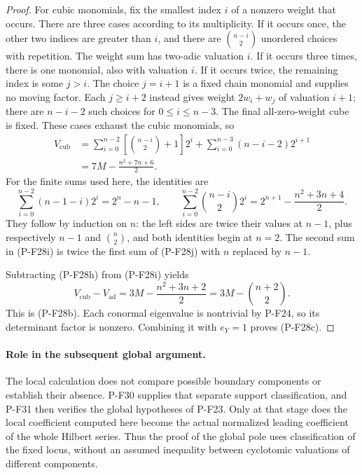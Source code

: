 \begin{proof}
For cubic monomials, fix the smallest index $i$
of a nonzero weight that occurs. There are three
cases according to its multiplicity. If it occurs
once, the other two indices are greater than $i$,
and there are $\binom{n-i}{2}$ unordered choices
with repetition. The weight sum has two-adic
valuation $i$. If it occurs three times, there is
one monomial, also with valuation $i$.
If it occurs twice, the remaining index is some
$j>i$. The choice $j=i+1$ is a fixed chain
monomial and supplies no moving factor. Each
$j\ge i+2$ instead gives weight $2w_i+w_j$ of
valuation $i+1$; there are $n-i-2$ such choices
for $0\le i\le n-3$. The final all-zero-weight
cube is fixed. These cases exhaust the cubic
monomials, so
\begin{align*}
 V_{\mathrm{cub}}
 &=\sum_{i=0}^{n-2}
        \left[\binom{n-i}{2}+1\right]2^i
      +\sum_{i=0}^{n-3}(n-i-2)2^{i+1}\\
 &=7M-\frac{n^2+7n+6}{2}.
 \tag{P-F28i}
\end{align*}
For the finite sums used here, the identities are
\[
 \sum_{i=0}^{n-2}(n-1-i)2^i=2^n-n-1,\qquad
 \sum_{i=0}^{n-2}\binom{n-i}{2}2^i
    =2^{n+1}-\frac{n^2+3n+4}{2}.
 \tag{P-F28j}
\]
They follow by induction on $n$: the left sides
are twice their values at $n-1$, plus respectively
$n-1$ and $\binom n2$, and both identities begin
at $n=2$. The second sum in (P-F28i) is twice the
first sum of (P-F28j) with $n$ replaced by $n-1$.

Subtracting (P-F28h) from (P-F28i) yields
\[
 V_{\mathrm{cub}}-V_{\mathrm{ad}}
     =3M-\frac{n^2+3n+2}{2}
     =3M-\binom{n+2}{2}.
 \tag{P-F28k}
\]
This is (P-F28b). Each conormal eigenvalue is
nontrivial by P-F24, so its determinant factor
is nonzero. Combining it with $e_Y=1$ proves
(P-F28c).
\end{proof}

\paragraph{Role in the subsequent global argument.}
The local calculation does not compare possible boundary
components or establish their absence. P-F30 supplies
that separate support classification, and P-F31 then
verifies the global hypotheses of P-F23. Only at that
stage does the local coefficient computed here become
the actual normalized leading coefficient of the whole
Hilbert series. Thus the proof of the global pole uses
classification of the fixed locus, without an assumed
inequality between cyclotomic valuations of different
components.
